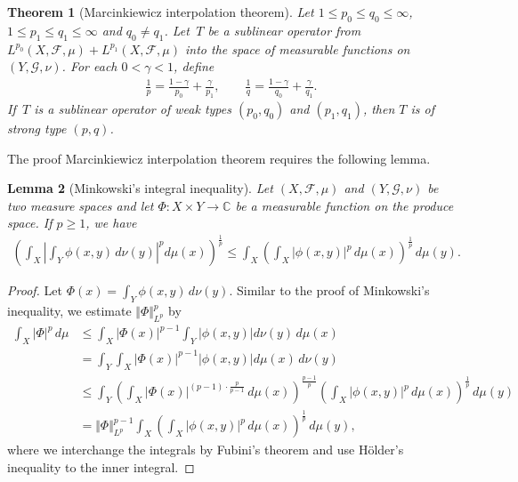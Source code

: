 \documentclass{article}
\numberwithin{equation}{section}
\newcommand{\bbC}{\mathbb{C}}
\newcommand{\scr}{\mathscr}
\theoremstyle{plain}
\newtheorem{theorem}{Theorem}[section]
\newtheorem{lemma}[theorem]{Lemma}
\theoremstyle{definition}
\begin{document}
\begin{theorem}[Marcinkiewicz interpolation theorem]\label{mckwz}
	Let $1\leq p_0\leq q_0\leq\infty$, $1\leq p_1\leq q_1\leq\infty$ and $q_0\neq q_1$. Let $\,T$ be a sublinear operator from $L^{p_0}(X,\scr{F},\mu)+L^{p_1}(X,\scr{F},\mu)$ into the space of measurable functions on $(Y,\scr{G},\nu)$. For each $0<\gamma<1$, define
	\begin{align*}
		\frac{1}{p}=\frac{1-\gamma}{p_0}+\frac{\gamma}{p_1},\qquad \frac{1}{q}=\frac{1-\gamma}{q_0}+\frac{\gamma}{q_1}.
	\end{align*}
	If $\,T$ is a sublinear operator of weak types $(p_0,q_0)$ and $(p_1,q_1)$, then $T$ is of strong type $(p,q)$.
\end{theorem}
The proof Marcinkiewicz interpolation theorem requires the following lemma.

\begin{lemma}[Minkowski's integral inequality]\label{mkwsk}
Let $(X,\scr{F},\mu)$ and $(Y,\scr{G},\nu)$ be two measure spaces and let $\Phi:X\times Y\to\bbC$ be a measurable function on the produce space. If $p\geq 1$, we have
\begin{align*}
	\left(\int_X\left\vert\int_Y\phi(x,y)\,d\nu(y)\right\vert^p d\mu(x)\right)^{\frac{1}{p}}\leq\int_X\left(\int_X\vert\phi(x,y)\vert^{p}\,d\mu(x)\right)^{\frac{1}{p}}\,d\mu(y).
\end{align*}
\end{lemma}
\begin{proof}
Let $\Phi(x)=\int_Y\phi(x,y)\,d\nu(y)$. Similar to the proof of Minkowski's inequality, we estimate $\Vert\Phi\Vert_{L^p}^p$ by
\begin{align*}
	\int_X\vert\Phi\vert^p\,d\mu&\leq\int_X\vert\Phi(x)\vert^{p-1}\int_Y\left\vert\phi(x,y)\right\vert d\nu(y)\,d\mu(x)\\
	&=\int_Y\int_X\vert\Phi(x)\vert^{p-1}\left\vert\phi(x,y)\right\vert d\mu(x)\,d\nu(y)\\
	&\leq\int_Y\left(\int_X\vert\Phi(x)\vert^{(p-1)\cdot\frac{p}{p-1}}\,d\mu(x)\right)^{\frac{p-1}{p}}\left(\int_X\vert\phi(x,y)\vert^{p}\,d\mu(x)\right)^{\frac{1}{p}}\,d\mu(y)\\
	&=\Vert\Phi\Vert_{L^p}^{p-1}\int_X\left(\int_X\vert\phi(x,y)\vert^{p}\,d\mu(x)\right)^{\frac{1}{p}}\,d\mu(y),
\end{align*}
where we interchange the integrals by Fubini's theorem and use Hölder's inequality to the inner integral.
\end{proof}
\end{document}
